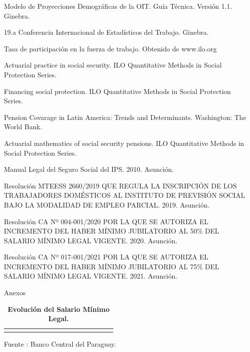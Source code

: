 \documentclass[a4paper,11pt]{article}
\begin{document}
\begin{thebibliography}{0}
   Modelo de Proyecciones Demográficas de la OIT. Guía Técnica. Versión 1.1. Ginebra.

   19.a Conferencia Internacional de Estadísticos del Trabajo. Ginebra.

   Tasa de participación en la fuerza de trabajo. Obtenido de www.ilo.org

   Actuarial practice in social security. ILO Quantitative Methods in Social Protection Series.

   Financing social protection. ILO Quantitative Methods in Social Protection Series.


    Pension Covarage in Latin America: Trends and Determinants. Washington: The World Bank.

   Actuarial mathematics of social security pensions. ILO Quantitative Methods in Social Protection Series.
  
   Manual Legal del Seguro Social del IPS. 2010. Asunción. 
  
   Resolución MTEESS 2660/2019 QUE REGULA LA INSCRIPCIÓN DE LOS TRABAJADORES DOMÉSTICOS AL INSTITUTO DE PREVISIÓN SOCIAL BAJO LA MODALIDAD DE EMPLEO PARCIAL. 2019. Asunción.
  
   Resolución CA Nº 004-001/2020 POR LA QUE SE AUTORIZA EL INCREMENTO DEL HABER MÍNIMO JUBILATORIO AL 50\% DEL SALARIO MÍNIMO LEGAL VIGENTE. 2020. Asunción.
  
    Resolución CA Nº 017-001/2021 POR LA QUE SE AUTORIZA EL INCREMENTO DEL HABER MÍNIMO JUBILATORIO AL 75\% DEL SALARIO MÍNIMO LEGAL VIGENTE. 2021. Asunción.
  
\end{thebibliography}


\caption{Anexos}

\begin{landscape}
\begin{table}[H]
\begin{center}
\caption{\bf{Evolución del Salario Mínimo Legal.}}
\label{eph2}
\begin{tabular}{l|rrrrrrrrrrrrrrr}
\scriptsize

\end{tabular}
	\item \footnotesize Fuente : Banco Central del Paraguay. 
\end{center}
\end{table} 
\end{landscape}
\end{document}
